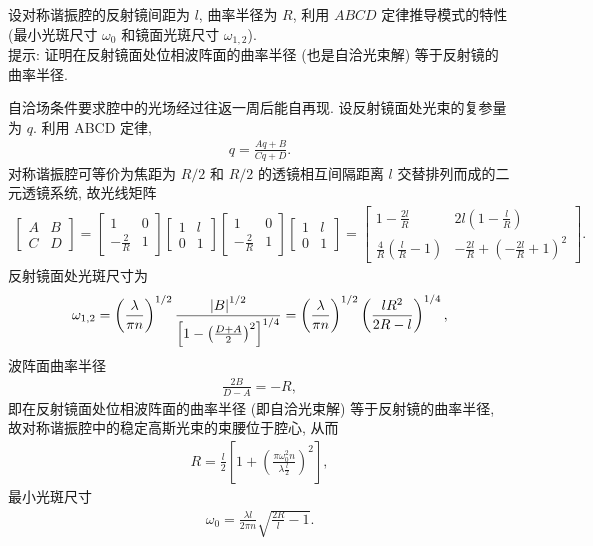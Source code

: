 \documentclass[twoside]{note}
\begin{document}
\begin{exe}
    设对称谐振腔的反射镜间距为 $l$, 曲率半径为 $R$, 利用 $ABCD$ 定律推导模式的特性 (最小光斑尺寸 $\omega_0$ 和镜面光斑尺寸 $\omega_{1,2}$).\\
    提示: 证明在反射镜面处位相波阵面的曲率半径 (也是自洽光束解) 等于反射镜的曲率半径.
\end{exe}
\begin{sol}
    自洽场条件要求腔中的光场经过往返一周后能自再现. 设反射镜面处光束的复参量为 $q$. 利用 ABCD 定律,
    \begin{align}
        q=\frac{Aq+B}{Cq+D}.
    \end{align}
    对称谐振腔可等价为焦距为 $R/2$ 和 $R/2$ 的透镜相互间隔距离 $l$ 交替排列而成的二元透镜系统, 故光线矩阵
    \begin{align}
        \begin{bmatrix}
            A&B\\
            C&D
        \end{bmatrix}=\begin{bmatrix}
            1&0\\
            -\frac{2}{R}&1
        \end{bmatrix}\begin{bmatrix}
            1&l\\
            0&1
        \end{bmatrix}\begin{bmatrix}
            1&0\\
            -\frac{2}{R}&1
        \end{bmatrix}\begin{bmatrix}
            1&l\\
            0&1
        \end{bmatrix}=\begin{bmatrix}
            1-\frac{2l}{R}&2l\left(1-\frac{l}{R}\right)\\
            \frac{4}{R}\left(\frac{l}{R}-1\right)&-\frac{2l}{R}+\left(-\frac{2l}{R}+1\right)^2
        \end{bmatrix}.
    \end{align}
    反射镜面处光斑尺寸为
    \begin{align}
        \omega_{1,2}=\left(\frac{\lambda}{\pi n}\right)^{1/2}\frac{\left\lvert B\right\rvert^{1/2}}{\left[1-\left(\frac{D+A}{2}\right)^2\right]^{1/4}}=\left(\frac{\lambda}{\pi n}\right)^{1/2}\left(\frac{lR^2}{2R-l}\right)^{1/4},
    \end{align}
    波阵面曲率半径
    \begin{align}
        \frac{2B}{D-A}=-R,
    \end{align}
    即在反射镜面处位相波阵面的曲率半径 (即自洽光束解) 等于反射镜的曲率半径, 故对称谐振腔中的稳定高斯光束的束腰位于腔心, 从而
    \begin{align}
        R=\frac{l}{2}\left[1+\left(\frac{\pi\omega_0^2n}{\lambda\frac{l}{2}}\right)^2\right],
    \end{align}
    最小光斑尺寸
    \begin{align}
        \omega_0=\frac{\lambda l}{2\pi n}\sqrt{\frac{2R}{l}-1}.
    \end{align}
\end{sol}
\end{document}

